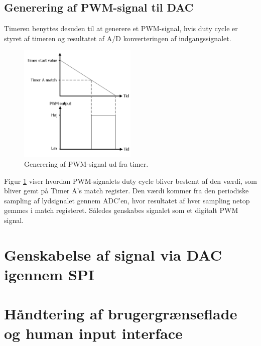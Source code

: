 \subsection{Generering af PWM-signal til DAC}
Timeren benyttes desuden til at generere et PWM-signal, hvis duty cycle er styret af timeren og resultatet af A/D konverteringen af indgangssignalet. 
\begin{figure}
	\centering
	\includegraphics[width=0.5\textwidth]{billeder/timer3PWM.png}
	\caption{\label{fig:PWMfromtimer}Generering af PWM-signal ud fra timer. }
\end{figure}
Figur \ref{fig:PWMfromtimer} viser hvordan PWM-signalets duty cycle bliver bestemt af den værdi, som bliver gemt på Timer A's match register. 
Den værdi kommer fra den periodiske sampling af lydsignalet gennem ADC'en, hvor resultatet af hver sampling netop gemmes i match registeret. 
Således genskabes signalet som et digitalt PWM signal. 

\section{Genskabelse af signal via DAC igennem SPI}

\section{Håndtering af brugergrænseflade og human input interface}



